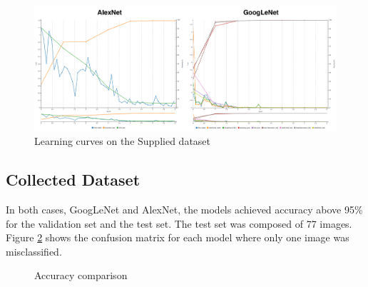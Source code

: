 \documentclass[10pt,journal,compsoc]{IEEEtran}
\begin{document}
\begin{figure}[thpb]
      \centering
      \includegraphics[width=\linewidth]{p_learning_curves.png}
      \caption{Learning curves on the Supplied dataset}
      \label{fig:learning_curves}
\end{figure}

\subsection{Collected Dataset}

In both cases, GoogLeNet and AlexNet, the models achieved accuracy above 95\% for the validation set and the test set. 
The test set was composed of 77 images. Figure \ref{fig:accuracy_comparisson} shows the confusion matrix for each model where only one image was misclassified.

\begin{figure}[thpb]
      \centering
      \vfill
      \caption{Accuracy comparison}
      \label{fig:accuracy_comparisson}
\end{figure}
\end{document}
